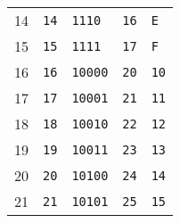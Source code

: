 \documentclass[aspectratio=169]{beamer}
\begin{document}
\begin{frame}[fragile]
\begin{center}
\begin{tabular}{c|R{2cm}|R{2cm}|R{2cm}|R{2cm}|}
    14         & \texttt{14}           & \texttt{1110 }        & \texttt{16}         & \texttt{E}                 \\ 
    15         & \texttt{15}           & \texttt{1111 }        & \texttt{17}         & \texttt{F}                 \\ 
    16         & \texttt{16}           & \texttt{10000}        & \texttt{20}         & \textcolor{naranjauca}{\texttt{10}}                \\ 
    17         & \texttt{17}           & \texttt{10001}        & \texttt{21}         & \texttt{11}                \\ 
    18         & \texttt{18}           & \texttt{10010}        & \texttt{22}         & \texttt{12}                \\ 
    19         & \texttt{19}           & \texttt{10011}        & \texttt{23}         & \texttt{13}                \\ 
    20         & \texttt{20}           & \texttt{10100}        & \texttt{24}         & \texttt{14}                \\ 
    21         & \texttt{21}           & \texttt{10101}        & \texttt{25}         & \texttt{15}                \\ 
    \end{tabular}
    \end{center}
\end{frame}
\end{document}

